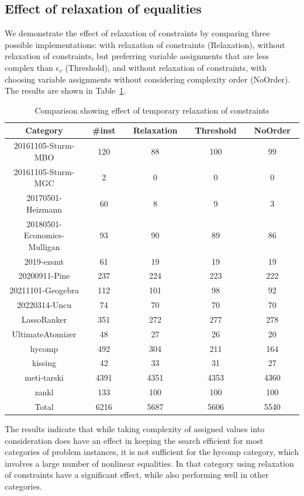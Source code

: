 \documentclass[runningheads]{llncs}
\begin{document}
\subsection{Effect of relaxation of equalities}

We demonstrate the effect of relaxation of constraints by comparing three possible implementations: with relaxation of constraints (Relaxation), without relaxation of constraints, but preferring variable assignments that are less complex than $\epsilon_v$ (Threshold), and without relaxation of constraints, with choosing variable assignments without considering complexity order (NoOrder). The results are shown in Table~\ref{tab:compare-relaxation}.

\begin{table}[!t]
\small
\centering
\begin{tabular}{c | c | c | c | c }
Category & ~\#inst~ & ~Relaxation~ & ~Threshold~ & ~NoOrder~ \\ \hline
20161105-Sturm-MBO & 120 & 88 & 100 & 99 \\
20161105-Sturm-MGC & 2 & 0 & 0 & 0 \\
20170501-Heizmann & 60 & 8 & 9 & 3 \\
20180501-Economics-Mulligan & 93 & 90 & 89 & 86 \\
2019-ezsmt & 61 & 19 & 19 & 19 \\
20200911-Pine & 237 & 224 & 223 & 222 \\
20211101-Geogebra & 112 & 101 & 98 & 92 \\
20220314-Uncu & 74 & 70 & 70 & 70 \\
LassoRanker & 351 & 272 & 277 & 278 \\
UltimateAtomizer & 48 & 27 & 26 & 20 \\
hycomp & 492 & 304 & 211 & 164 \\
kissing & 42 & 33 & 31 & 27 \\
meti-tarski & 4391 & 4351 & 4353 & 4360 \\
zankl & 133 & 100 & 100 & 100 \\ \hline
Total & 6216 & 5687 & 5606 & 5540
\end{tabular}
\vspace{2mm}
\caption{Comparison showing effect of temporary relaxation of constraints}
\label{tab:compare-relaxation}
\end{table}

The results indicate that while taking complexity of assigned values into consideration does have an effect in keeping the search efficient for most categories of problem instances, it is not sufficient for the \textsf{hycomp} category, which involves a large number of nonlinear equalities. In that category using relaxation of constraints have a significant effect, while also performing well in other categories.
\end{document}
